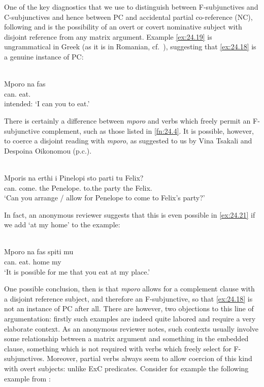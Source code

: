 \documentclass[output=paper]{langsci/langscibook}
\begin{document}
One of the key diagnostics that we use to distinguish between F-subjunctives
and C-subjunctives and hence between \gls{PC} and
accidental partial co-reference (NC), following \citet{Varlokosta1994} and
\citet{Landau2004} is the possibility of an overt or covert
nominative subject with disjoint reference from any matrix
argument. Example \eqref{ex:24.19} is ungrammatical in Greek (as it is in
Romanian, cf.\ ), suggesting that \eqref{ex:24.18} is a
genuine instance of PC:

\ea%
    \label{ex:24.19}\\
	\gll \llap{*}Mporo   na   fas\\
        can.\Fsg{}  \Sbjv{}   eat.\Ssg{}\\
    \glt intended: ‘I can you to eat.’
\z

There is certainly a difference between \emph{mporo} and verbs which freely
permit an F-subjunctive complement, such as those listed in \cref{fn:24.4}. It
is possible, however, to coerce a disjoint reading with \emph{mporo}, as
suggested to us by Vina Tsakali and Despoina Oikonomou (p.c.).

\ea%
    \label{ex:24.20}\\
	\gll Mporis  na   erthi     i Pinelopi     sto   parti   tu  Felix?\\
		can.\Ssg{} \Sbjv{}   come.\Tsg{}   the Penelope.\Nom{}      to.the   party   the Felix.\Gen{}\\
	\glt ‘Can you arrange / allow for Penelope to come to Felix’s party?’
\z

In fact, an anonymous reviewer suggests that this is even possible in
\eqref{ex:24.21} if we add ‘at my home’ to the example:

\ea%
    \label{ex:24.21}\\
	\gll Mporo   na   fas   spiti mu\\
    can.\Fsg{}   \Sbjv{}   eat.\Ssg{}  home my\\
	\glt ‘It is possible for me that you eat at my place.’
\z

One possible conclusion, then is that \emph{mporo} allows for a complement
clause with a disjoint reference subject, and therefore an F-subjunctive, so
that \eqref{ex:24.18} is not an instance of \gls{PC} after all.
There are however, two objections to this line of argumentation: firstly such
examples are indeed quite labored and require a very elaborate context. As an
anonymous reviewer notes, such contexts usually involve some relationship
between a matrix argument and something in the embedded clause, something which
is not required with verbs which freely select for F-subjunctives. Moreover,
partial  verbs always seem to allow coercion of this kind with overt
subjects: unlike \gls{ExC} predicates. Consider
for example the following example from :
\end{document}
